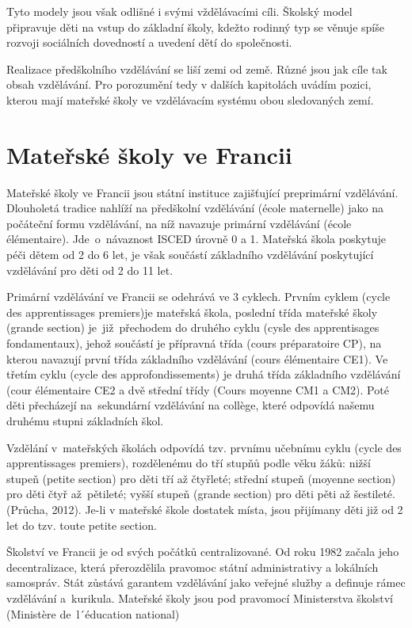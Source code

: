 		Tyto modely jsou však odlišné i svými vždělávacími cíli. Školský model připravuje děti na vstup do základní školy, kdežto rodinný typ se věnuje spíše rozvoji sociálních dovedností a uvedení dětí do společnosti.

		Realizace předškolního vzdělávání se liší zemi od země. Různé jsou jak cíle tak obsah vzdělávání. Pro porozumění tedy v dalších kapitolách uvádím pozici, kterou mají mateřské školy ve vzdělávacím systému obou sledovaných zemí. 
		

	\section{Mateřské školy ve Francii}
		Mateřské školy ve Francii jsou státní instituce zajišťující preprimární vzdělávání. Dlouholetá tradice nahlíží na předškolní vzdělávání (école maternelle) jako na počáteční formu vzdělávání, na níž navazuje primární vzdělávání (école élémentaire). Jde o návaznost ISCED  úrovně 0 a 1. Mateřská škola poskytuje péči dětem od 2 do 6 let, je však součástí základního vzdělávání poskytující vzdělávání pro děti od 2 do 11 let.

		Primární vzdělávání ve Francii se odehrává ve 3 cyklech. Prvním cyklem (cycle des apprentissages premiers)je mateřská škola, poslední třída mateřské školy (grande section) je již přechodem do druhého cyklu (cysle des apprentisages fondamentaux), jehož součástí je přípravná třída (cours préparatoire CP), na kterou navazují první třída základního vzdělávání (cours élémentaire CE1). Ve třetím cyklu (cycle des approfondissements) je druhá třída základního vzdělávání (cour élémentaire CE2 a dvě střední třídy (Cours moyenne CM1 a CM2). Poté děti přecházejí na sekundární vzdělávání na collège, které odpovídá našemu druhému stupni základních škol. 

		Vzdělání v mateřských školách odpovídá tzv. prvnímu učebnímu cyklu (cycle des apprentissages premiers), rozdělenému do tří stupňů podle věku žáků: nižší stupeň (petite section) pro děti tří až čtyřleté; střední stupeň (moyenne section) pro děti čtyř až pětileté; vyšší stupeň (grande section) pro děti pěti až šestileté.
		(Průcha, 2012). 
		Je-li v mateřské škole dostatek místa, jsou přijímany děti již od 2 let do tzv. toute petite section. 

		Školství ve Francii je od svých počátků centralizované. Od roku 1982 začala jeho decentralizace, která přerozdělila pravomoc státní administrativy a lokálních samospráv. Stát zůstává garantem vzdělávání jako veřejné služby a definuje rámec vzdělávání a kurikula. Mateřské školy jsou pod pravomocí Ministerstva školství (Ministère de l´éducation national)

